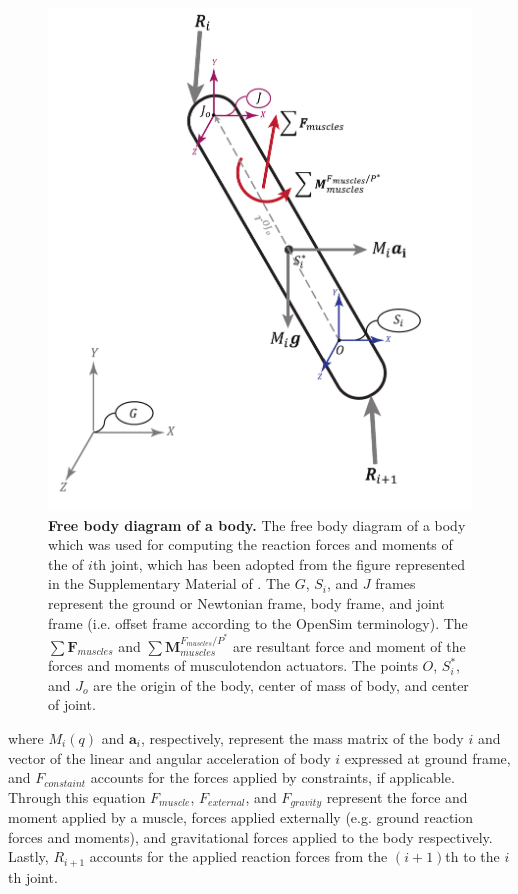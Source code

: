 \documentclass[10pt,letterpaper]{article}
\begin{document}
\begin{figure}[!t]
	\centering
	\includegraphics[scale=0.35]{Cartoons/JointReactionForce_FBD.pdf} 
	\caption{\small{\textbf{Free body diagram of a body.} The free body diagram of a body which was used for computing the reaction forces and moments of the of $i$th joint, which has been adopted from the figure represented in the Supplementary Material of \cite{151}. The $G$, $S_i$, and $J$ frames represent the ground or Newtonian frame, body frame, and joint frame (i.e. offset frame according to the OpenSim terminology). The $\sum\mathbf{F}_{muscles}$ and  $\sum\mathbf{M}^{F_{muscles}/P^*}_{muscles}$ are resultant force and moment of the forces and moments of musculotendon actuators. The points $O$, $S^*_i$, and $J_o$ are the origin of the body, center of mass of body, and center of joint.}}
	\label{Fig_JRF_FBD}
\end{figure}
where $M_i(q)$ and ${\mathit{\mathbf{a}}}_i$, respectively, represent the mass matrix of the body $i$ and vector of the linear and angular acceleration of body $i$ expressed at ground frame, and $F_{constaint}$ accounts for the forces applied by constraints, if applicable. Through this equation $F_{muscle}$, $F_{external}$, and $F_{gravity}$ represent the force and moment applied by a muscle, forces applied externally (e.g. ground reaction forces and moments), and gravitational forces applied to the body respectively. Lastly, $R_{i+1}$ accounts for the applied reaction forces from the $(i+1)$th to the $i$th joint.\\
\end{document}
